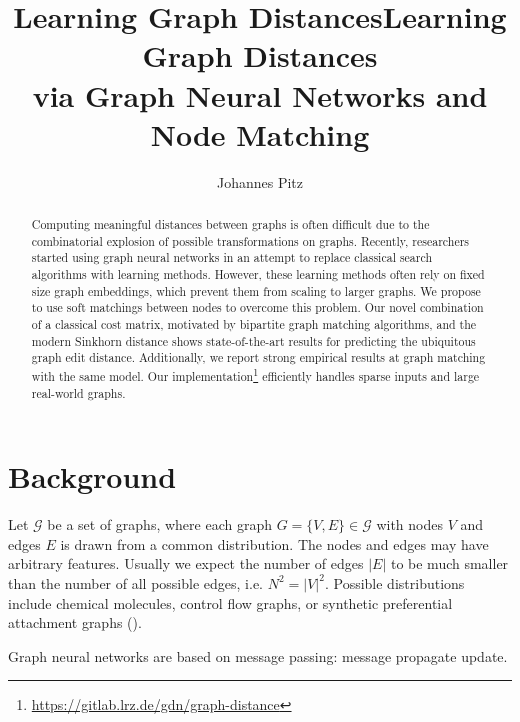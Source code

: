 \documentclass[a4paper,10pt]{article}
\title{Learning Graph Distances} %
\author{Johannes Pitz} %
\institute{\textit{Guided Research: Data Analytics and Machine Learning Group  \protect\\ TUM Department of Informatics}}
\begin{document}
\title{Learning Graph Distances \protect\\ via Graph Neural Networks and Node Matching}
\maketitle

\begin{abstract}


Computing meaningful distances between graphs is often difficult due to the combinatorial explosion of possible transformations on graphs. Recently, researchers started using graph neural networks in an attempt to replace classical search algorithms with learning methods. However, these learning methods often rely on fixed size graph embeddings, which prevent them from scaling to larger graphs. We propose to use soft matchings between nodes to overcome this problem. Our novel combination of a classical cost matrix, motivated by bipartite graph matching algorithms, and the modern Sinkhorn distance shows state-of-the-art results for predicting the ubiquitous graph edit distance. Additionally, we report strong empirical results at graph matching with the same model. Our implementation\footnote{\url{https://gitlab.lrz.de/gdn/graph-distance}} efficiently handles sparse inputs and large real-world graphs.


\end{abstract}



\section{Background}

Let $\mathcal{G}$ be a set of graphs, where each graph $G = \{V, E\} \in \mathcal{G}$ with nodes $V$ and edges $E$ is drawn from a common distribution. The nodes and edges may have arbitrary features. Usually we expect the number of edges $\vert E \vert$ to be much smaller than the number of all possible edges, i.e. $N^2 = \vert V \vert ^2$. Possible distributions include chemical molecules, control flow graphs, or synthetic preferential attachment graphs (\citealp{pref_att2002}).

Graph neural networks are based on message passing:
message
propagate
update.













\newpage





\newpage


\end{document}
